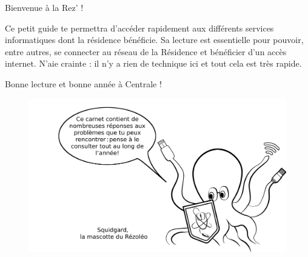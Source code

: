\documentclass[12pt]{article}
\begin{document}
  \vspace*{0.5cm}
  Bienvenue à la Rez’ ! 
  \newline

  Ce petit guide te permettra d’accéder rapidement aux différents services informatiques dont la résidence bénéficie. Sa lecture est essentielle pour pouvoir, entre autres, se connecter au réseau de la Résidence et bénéficier d’un accès internet.
  N’aie crainte : il n’y a rien de technique ici et tout cela est très rapide.
  \newline

  Bonne lecture et bonne année à Centrale !  \newline
  \vspace*{3cm}
  \begin{figure}[h!]
    \centerline{\includegraphics[scale=0.13]{imageAccueil.png}}
  \end{figure}

  \newpage
\end{document}
